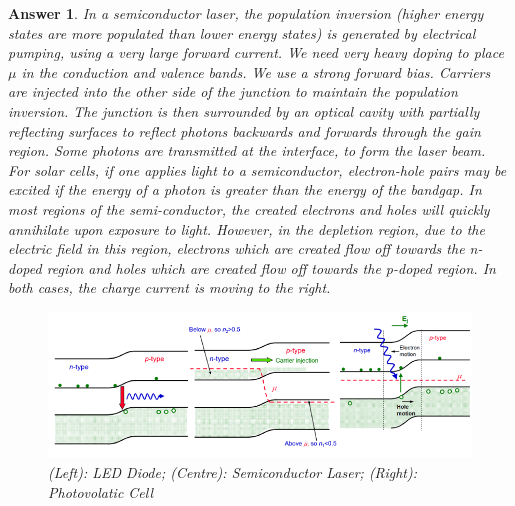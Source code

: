 \documentclass[a4paper]{article}
\newtheorem{ans}{Answer}[section]
\theoremstyle{new}
\begin{document}
\begin{ans}
In a semiconductor laser, the population inversion (higher energy states are more populated than lower energy states) is generated by electrical pumping, using a very large forward current. We need very heavy doping to place $\mu$ in the conduction and valence bands. We use a strong forward bias. Carriers are injected into the other side of the junction to maintain the population inversion. The junction is then surrounded by an optical cavity with partially reflecting surfaces to reflect photons backwards and forwards through the gain region. Some photons are transmitted at the interface, to form the laser beam.\\[5pt]
For solar cells, if one applies light to a semiconductor, electron-hole pairs may be excited if the energy of a photon is greater than the energy of the bandgap. In most regions of the semi-conductor, the created electrons and holes will quickly annihilate upon exposure to light. However, in the depletion region, due to the electric field in this region, electrons which are created flow off towards the n-doped region and holes which are created flow off towards the p-doped region. In both cases, the charge current is moving to the right.
\begin{figure}[H]
    \centering
    \includegraphics[width=\linewidth]{semicon3.PNG}
    \caption{(Left): LED Diode; (Centre): Semiconductor Laser; (Right): Photovolatic Cell}
\end{figure}
\end{ans}
\end{document}

